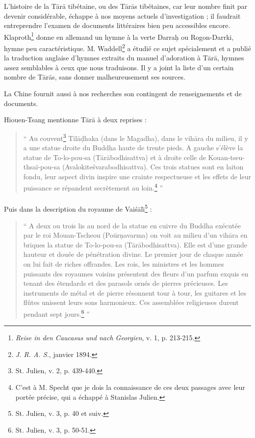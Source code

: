 \documentclass[a4paper, 11pt, oneside, french]{article}
\begin{document}
L'histoire de la T\={a}r\={a} tibétaine, ou des T\={a}r\={a}s tibétaines, car leur nombre finit par devenir considérable, échappe à nos moyens actuels d'investigation ; il faudrait entreprendre l'examen de documents littéraires bien peu accessibles encore. Klaproth\footnote{\emph{Reise in den Caucasus und nach Georgien}, v. 1, p. 213-215.} donne en allemand un hymne à la verte Darra\d{h} ou Rogon-Darrki, hymne peu caractéristique. M. Waddell\footnote{\emph{J. R. A. S.}, janvier 1894.} a étudié ce sujet spécialement et a publié la traduction anglaise d'hymnes extraits du manuel d'adoration à T\={a}r\={a}, hymnes assez semblables à ceux que nous traduisons. Il y a joint la liste d'un certain nombre de T\={a}r\={a}s, sans donner malheureusement ses sources.

La Chine fournit aussi à nos recherches son contingent de renseignements et de documents.

Hiouen-Tsang mentionne T\={a}r\={a} à deux reprises :
\begin{quotation}
`` Au couvent\footnote{St. Julien, v. 2, p. 439-440.} Til\={a}\d{d}haka (dans le Magadha), dans le vih\={a}ra du milieu, il y a une statue droite du Buddha haute de trente pieds. A gauche s'élève la statue de To-lo-pou-sa (T\={a}r\={a}bodhisattva) et à droite celle de Kouan-tseu-thsaï-pou-sa (Avalokite\'{s}varabodhisattva). Ces trois statues sont en laiton fondu, leur aspect divin inspire une crainte respectueuse et les effets de leur puissance se répandent secrètement au loin.\footnote{C'est à M. Specht que je dois la connaissance de ces deux passages avec leur portée précise, qui a échappé à Stanislas Julien.} ''
\end{quotation}
\paragraph{}
Puis dans la description du royaume de Vai\'{s}\={a}l\={\i}\footnote{St. Julien, v. 3, p. 40 et suiv.} :
\begin{quotation}
`` A deux ou trois lis au nord de la statue en cuivre du Buddha exécutée par le roi Mouan-Tscheou (Po\={u}r\d{n}avarma) on voit au milieu d'un vih\={a}ra en briques la statue de To-lo-pou-sa (T\={a}r\={a}bodhisattva). Elle est d'une grande hauteur et douée de pénétration divine. Le premier jour de chaque année on lui fait de riches offrandes. Les rois, les ministres et les hommes puissants des royaumes voisins présentent des fleurs d'un parfum exquis en tenant des étendards et des parasols ornés de pierres précieuses. Les instruments de métal et de pierre résonnent tour à tour, les guitares et les flûtes unissent leurs sons harmonieux. Ces assemblées religieuses durent pendant sept jours.\footnote{St. Julien, v. 3, p. 50-51.} ''
\end{quotation}
\end{document}
